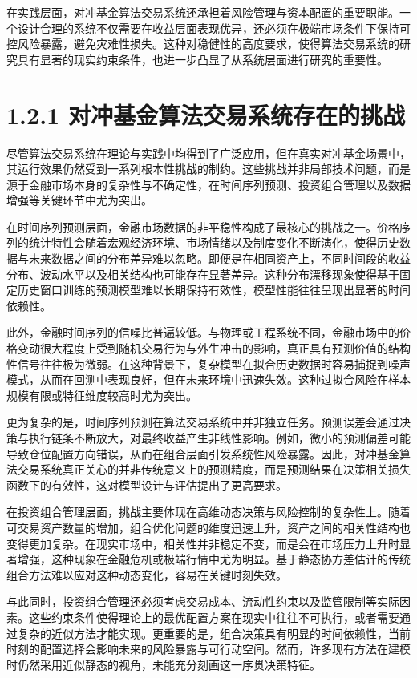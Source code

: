 \documentclass[UTF8]{ctexart}
\begin{document}
在实践层面，对冲基金算法交易系统还承担着风险管理与资本配置的重要职能。一个设计合理的系统不仅需要在收益层面表现优异，还必须在极端市场条件下保持可控风险暴露，避免灾难性损失。这种对稳健性的高度要求，使得算法交易系统的研究具有显著的现实约束条件，也进一步凸显了从系统层面进行研究的重要性。

\section{1.2.1
对冲基金算法交易系统存在的挑战}\label{ux5bf9ux51b2ux57faux91d1ux7b97ux6cd5ux4ea4ux6613ux7cfbux7edfux5b58ux5728ux7684ux6311ux6218}

尽管算法交易系统在理论与实践中均得到了广泛应用，但在真实对冲基金场景中，其运行效果仍然受到一系列根本性挑战的制约。这些挑战并非局部技术问题，而是源于金融市场本身的复杂性与不确定性，在时间序列预测、投资组合管理以及数据增强等关键环节中尤为突出。

在时间序列预测层面，金融市场数据的非平稳性构成了最核心的挑战之一。价格序列的统计特性会随着宏观经济环境、市场情绪以及制度变化不断演化，使得历史数据与未来数据之间的分布差异难以忽略。即便是在相同资产上，不同时间段的收益分布、波动水平以及相关结构也可能存在显著差异。这种分布漂移现象使得基于固定历史窗口训练的预测模型难以长期保持有效性，模型性能往往呈现出显著的时间依赖性。

此外，金融时间序列的信噪比普遍较低。与物理或工程系统不同，金融市场中的价格变动很大程度上受到随机交易行为与外生冲击的影响，真正具有预测价值的结构性信号往往极为微弱。在这种背景下，复杂模型在拟合历史数据时容易捕捉到噪声模式，从而在回测中表现良好，但在未来环境中迅速失效。这种过拟合风险在样本规模有限或特征维度较高时尤为突出。

更为复杂的是，时间序列预测在算法交易系统中并非独立任务。预测误差会通过决策与执行链条不断放大，对最终收益产生非线性影响。例如，微小的预测偏差可能导致仓位配置方向错误，从而在组合层面引发系统性风险暴露。因此，对冲基金算法交易系统真正关心的并非传统意义上的预测精度，而是预测结果在决策相关损失函数下的有效性，这对模型设计与评估提出了更高要求。

在投资组合管理层面，挑战主要体现在高维动态决策与风险控制的复杂性上。随着可交易资产数量的增加，组合优化问题的维度迅速上升，资产之间的相关性结构也变得更加复杂。在现实市场中，相关性并非稳定不变，而是会在市场压力上升时显著增强，这种现象在金融危机或极端行情中尤为明显。基于静态协方差估计的传统组合方法难以应对这种动态变化，容易在关键时刻失效。

与此同时，投资组合管理还必须考虑交易成本、流动性约束以及监管限制等实际因素。这些约束条件使得理论上的最优配置方案在现实中往往不可执行，或者需要通过复杂的近似方法才能实现。更重要的是，组合决策具有明显的时间依赖性，当前时刻的配置选择会影响未来的风险暴露与可行动空间。然而，许多现有方法在建模时仍然采用近似静态的视角，未能充分刻画这一序贯决策特征。
\end{document}
